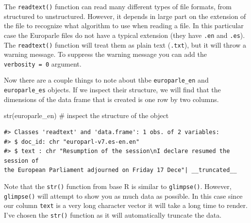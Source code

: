 \documentclass[
  letterpaper,
]{latex/krantz}
\newenvironment{Shaded}{\begin{snugshade}}{\end{snugshade}}
\newcommand{\CommentTok}[1]{\textcolor[rgb]{0.37,0.37,0.37}{#1}}
\newcommand{\FunctionTok}[1]{\textcolor[rgb]{0.28,0.35,0.67}{#1}}
\newcommand{\NormalTok}[1]{\textcolor[rgb]{0.00,0.23,0.31}{#1}}
\begin{document}
\begin{tcolorbox}[enhanced jigsaw, opacitybacktitle=0.6, breakable, colframe=quarto-callout-warning-color-frame, arc=.35mm, left=2mm, leftrule=.75mm, title=\textcolor{quarto-callout-warning-color}{\faExclamationTriangle}\hspace{0.5em}{Tip}, opacityback=0, colback=white, toptitle=1mm, rightrule=.15mm, titlerule=0mm, bottomtitle=1mm, bottomrule=.15mm, coltitle=black, colbacktitle=quarto-callout-warning-color!10!white, toprule=.15mm]
The \texttt{readtext()} function can read many different types of file
formats, from structured to unstructured. However, it depends in large
part on the extension of the file to recognize what algorithm to use
when reading a file. In this particular case the Europarle files do not
have a typical extension (they have \texttt{.en} and \texttt{.es}). The
\texttt{readtext()} function will treat them as plain text
(\texttt{.txt}), but it will throw a warning message. To suppress the
warning message you can add the \texttt{verbosity\ =\ 0} argument.
\end{tcolorbox}

Now there are a couple things to note about thbe \texttt{europarle\_en}
and \texttt{europarle\_es} objects. If we inspect their structure, we
will find that the dimensions of the data frame that is created is one
row by two columns.

\begin{Shaded}
\begin{Highlighting}[]
\FunctionTok{str}\NormalTok{(europarle\_en) }\CommentTok{\# inspect the structure of the object}
\end{Highlighting}
\end{Shaded}

\begin{verbatim}
#> Classes 'readtext' and 'data.frame': 1 obs. of 2 variables:
#> $ doc_id: chr "europarl-v7.es-en.en"
#> $ text : chr "Resumption of the session\nI declare resumed the session of
the European Parliament adjourned on Friday 17 Dece"| __truncated__
\end{verbatim}

\begin{tcolorbox}[enhanced jigsaw, opacitybacktitle=0.6, breakable, colframe=quarto-callout-warning-color-frame, arc=.35mm, left=2mm, leftrule=.75mm, title=\textcolor{quarto-callout-warning-color}{\faExclamationTriangle}\hspace{0.5em}{Tip}, opacityback=0, colback=white, toptitle=1mm, rightrule=.15mm, titlerule=0mm, bottomtitle=1mm, bottomrule=.15mm, coltitle=black, colbacktitle=quarto-callout-warning-color!10!white, toprule=.15mm]
Note that the \texttt{str()} function from base R is similar to
\texttt{glimpse()}. However, \texttt{glimpse()} will attempt to show you
as much data as possible. In this case since our column \texttt{text} is
a very long character vector it will take a long time to render. I've
chosen the \texttt{str()} function as it will automatically truncate the
data.
\end{tcolorbox}
\end{document}
